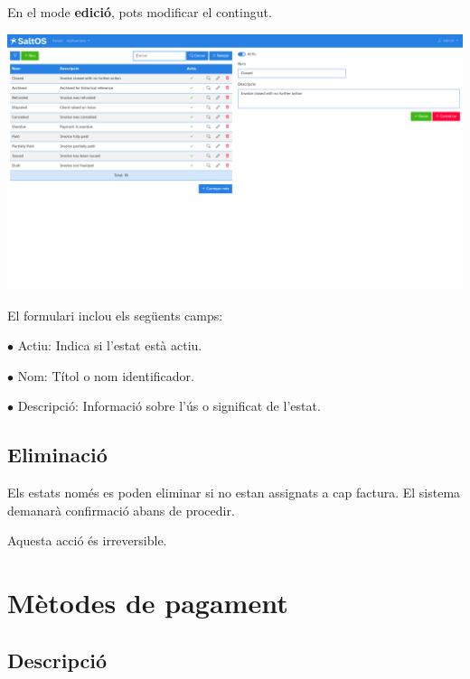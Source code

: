 \documentclass[a4paper]{article}
\begin{document}
En el mode \textbf{edició}, pots modificar el contingut.

\begin{center}\includegraphics[width=1\textwidth]{../ujest/snaps/test-screenshots-js-screenshots-sales-invoices-status-edit-10-ca-es-1-snap.png}\end{center}

El formulari inclou els següents camps:

\begin{compactitem}
\item[\color{myblue}$\bullet$] Actiu: Indica si l'estat està actiu.
\item[\color{myblue}$\bullet$] Nom: Títol o nom identificador.
\item[\color{myblue}$\bullet$] Descripció: Informació sobre l'ús o significat de l'estat.
\end{compactitem}

\hypertarget{toc145}{}
\subsection{Eliminació}

Els estats només es poden eliminar si no estan assignats a cap factura.
El sistema demanarà confirmació abans de procedir.

Aquesta acció és irreversible.


\hypertarget{toc146}{}
\section{Mètodes de pagament}

\hypertarget{toc147}{}
\subsection{Descripció}
\end{document}
